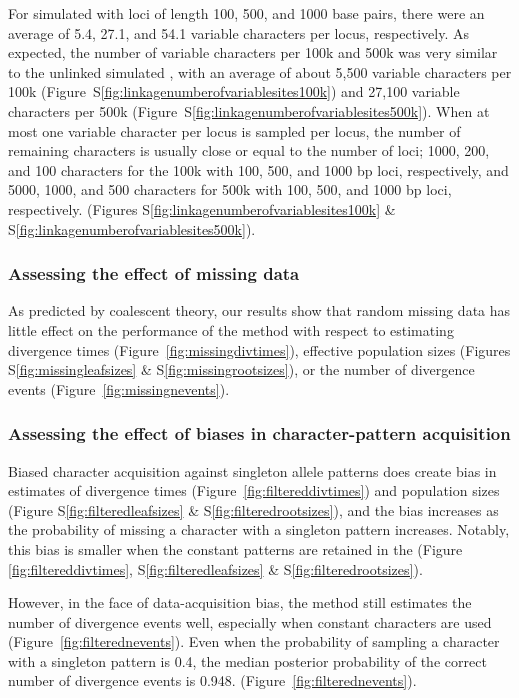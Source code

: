 For simulated \datasets with loci of length 100, 500, and 1000 base pairs, there
were an average of 5.4, 27.1, and 54.1 variable characters per locus,
respectively.
As expected, the number of variable characters per 100k and 500k \dataset
was very similar to the unlinked simulated \datasets, with an average of
about
5,500 variable characters per 100k \dataset
(Figure~S\ref{fig:linkagenumberofvariablesites100k})
and
27,100 variable characters per 500k \dataset
(Figure~S\ref{fig:linkagenumberofvariablesites500k}).
When at most one variable character per locus is sampled per locus, the
number of remaining characters is usually close or equal to the
number of loci;
1000, 200, and 100 characters for the 100k \datasets
with 100, 500, and 1000 bp loci, respectively, and
5000, 1000, and 500 characters for 500k \datasets
with 100, 500, and 1000 bp loci, respectively.
(Figures
S\ref{fig:linkagenumberofvariablesites100k}
\&
S\ref{fig:linkagenumberofvariablesites500k}).


\subsubsection{Assessing the effect of missing data}

As predicted by coalescent theory, our results show that random missing data
has little effect on the performance of the method with respect to estimating
divergence times
(Figure~\ref{fig:missingdivtimes}),
effective population sizes
(Figures
S\ref{fig:missingleafsizes}
\&
S\ref{fig:missingrootsizes}), or the number of divergence events
(Figure~\ref{fig:missingnevents}).


\subsubsection{Assessing the effect of biases in character-pattern acquisition}

Biased character acquisition against singleton allele patterns does create
bias in estimates of divergence times
(Figure~\ref{fig:filtereddivtimes}) and
population sizes
(Figure
S\ref{fig:filteredleafsizes}
\&
S\ref{fig:filteredrootsizes}), and the bias increases as the probability of
missing a character with a singleton pattern increases.
Notably, this bias is smaller when the constant patterns are retained in
the \dataset
(Figure
\ref{fig:filtereddivtimes},
S\ref{fig:filteredleafsizes}
\&
S\ref{fig:filteredrootsizes}).

However, in the face of data-acquisition bias, the method still estimates the
number of divergence events well, especially when constant characters are used
(Figure~\ref{fig:filterednevents}).
Even when the probability of sampling a character with a singleton pattern is
0.4, the median posterior probability of the correct number of divergence
events is 0.948.
(Figure~\ref{fig:filterednevents}).


